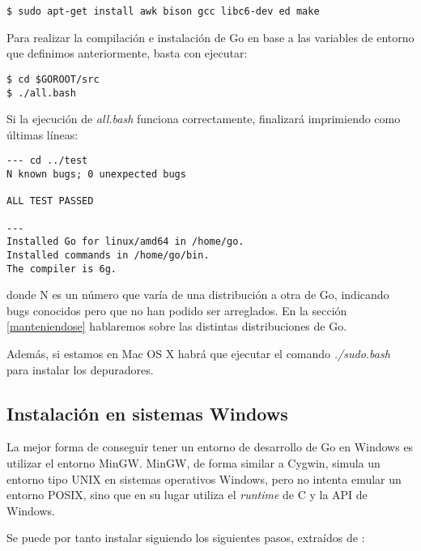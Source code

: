\begin{lstlisting}[numbers=none]
$ sudo apt-get install awk bison gcc libc6-dev ed make
\end{lstlisting}

	Para realizar la compilación e instalación de Go en base a las variables de
	entorno que definimos anteriormente, basta con ejecutar:

\begin{lstlisting}[numbers=none]
$ cd $GOROOT/src
$ ./all.bash
\end{lstlisting}

	Si la ejecución de \emph{all.bash} funciona correctamente, finalizará
	imprimiendo como últimas líneas:

\begin{lstlisting}[numbers=none]
--- cd ../test
N known bugs; 0 unexpected bugs

ALL TEST PASSED

---
Installed Go for linux/amd64 in /home/go.
Installed commands in /home/go/bin.
The compiler is 6g.
\end{lstlisting}

	donde N es un número que varía de una distribución a otra de Go, indicando bugs
	conocidos pero que no han podido ser arreglados. En la sección
	\ref{manteniendose} hablaremos sobre las distintas distribuciones de
	Go.

	Además, si estamos en Mac OS X habrá que ejecutar el comando
	\emph{./sudo.bash} para instalar los depuradores.

	\subsection{Instalación en sistemas Windows}

	La mejor forma de conseguir tener un entorno de desarrollo de Go en Windows es
	utilizar el entorno MinGW\cite{MinGW}. MinGW, de forma similar a Cygwin, simula
	un entorno tipo UNIX en sistemas operativos Windows, pero no intenta emular un
	entorno POSIX, sino que en su lugar utiliza el \emph{runtime} de C y la API de
	Windows\cite{MiekGieben}.

	Se puede por tanto instalar siguiendo los siguientes pasos, extraídos de
	\cite{MiekGieben}:

